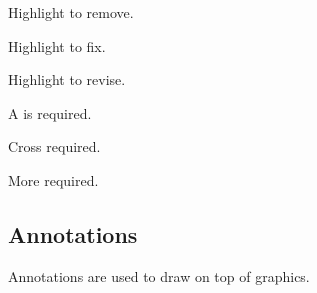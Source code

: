 \documentclass[10pt,titlepage]{article}
\begin{document}
\begin{example}
Highlight  to remove.
\todoremove{}
\end{example}

\begin{example}
Highlight  to fix.
\todofix{}
\end{example}

\begin{example}
Highlight  to revise.
\todorevise{}
\end{example}

\begin{example}
A  is required.
\todocite{}
\end{example}

\begin{example}
Cross  required.
\todoref{}
\end{example}

\begin{example}
More  required.
\todomore{}
\end{example}

\begin{example}
\todosentence
\end{example}

\begin{example}
\todopar
\end{example}

{
\begin{example}
\todobox
\end{example}
}

\makeatletter
\let\@stz@warning\old@stz@warning
\let\old@stz@warning\undefined
\makeatother


\subsection{Annotations}

Annotations are used to draw on top of graphics.
\end{document}
